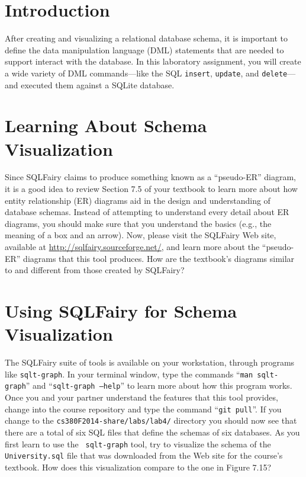


\usepackage[compact]{titlesec}



\section*{Introduction}

After creating and visualizing a relational database schema, it is important to define the data manipulation language
(DML) statements that are needed to support interact with the database.  In this laboratory assignment, you will create
a wide variety of DML commands---like the SQL {\tt insert}, {\tt update}, and {\tt delete}---and executed them against a
SQLite database.

\vspace*{-.05in}
\section*{Learning About Schema Visualization}

Since SQLFairy claims to produce something known as a ``pseudo-ER'' diagram, it is a good idea to review Section 7.5 of
your textbook to learn more about how entity relationship (ER) diagrams aid in the design and understanding of database
schemas. Instead of attempting to understand every detail about ER diagrams, you should make sure that you understand
the basics (e.g., the meaning of a box and an arrow). Now, please visit the SQLFairy Web site, available at
\url{http://sqlfairy.sourceforge.net/}, and learn more about the ``pseudo-ER'' diagrams that this tool produces. How are
the textbook's diagrams similar to and different from those created by SQLFairy?

\vspace*{-.05in}
\section*{Using SQLFairy for Schema Visualization}

The SQLFairy suite of tools is available on your workstation, through programs like {\tt sqlt-graph}.  In your terminal
window, type the commands ``{\tt man sqlt-graph}'' and ``{\tt sqlt-graph --help}'' to learn more about how this program
works. Once you and your partner understand the features that this tool provides, change into the course repository and
type the command ``{\tt git pull}''. If you change to the {\tt cs380F2014-share/labs/lab4/} directory you should now see
that there are a total of six SQL files that define the schemas of six databases. As you first learn to use the {\tt
  sqlt-graph} tool, try to visualize the schema of the {\tt University.sql} file that was downloaded from the Web site
for the course's textbook. How does this visualization compare to the one in Figure 7.15? 

